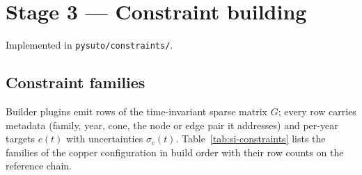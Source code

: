 \documentclass[11pt]{article}
\begin{document}
\begin{table}[h]
\caption{Imputer rules in execution order. The driver selects the noisy-zero
flat prior; a magnitude-aware mode (coverage-dependent CV on a per-group
magnitude scale) is the library default and is available as an alternative.
Fill counts per imputer are in Table~\ref{tab:si-fills}.}
\label{tab:si-imputers}
\end{table}

\section{Stage 3 --- Constraint building}\label{si:stage3}
Implemented in \texttt{pysuto/constraints/}.

\subsection{Constraint families}
Builder plugins emit rows of the time-invariant sparse matrix $G$; every row
carries metadata (family, year, cone, the node or edge pair it addresses) and
per-year targets $c(t)$ with uncertainties $\sigma_c(t)$.
Table~\ref{tab:si-constraints} lists the families of the copper
configuration in build order with their row counts on the reference chain.
\end{document}
